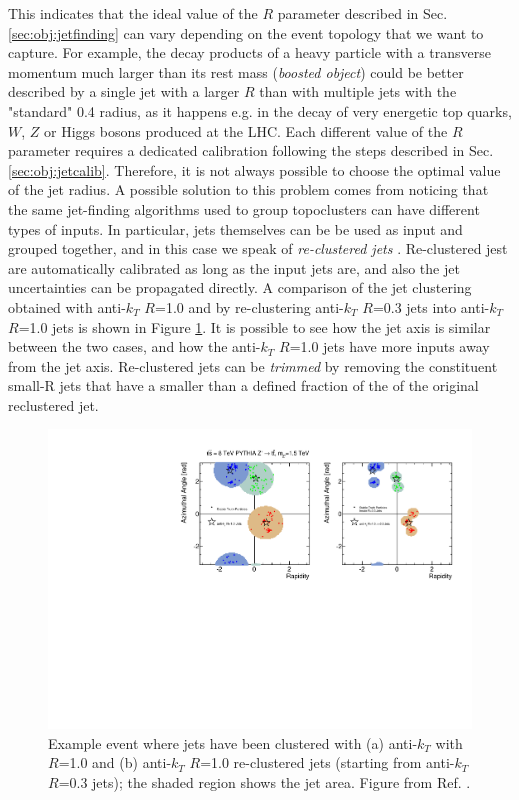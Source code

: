 This indicates that the ideal value of the $R$ parameter described in Sec. \ref{sec:obj:jetfinding} can vary depending on the event topology that we want to capture. 
For example, the decay products of a heavy particle with a transverse momentum much larger than its rest mass (\textit{boosted object}) could be better described by a 
single jet with a larger $R$ than with multiple jets with the "standard" 0.4 radius, 
as it happens e.g. in the decay of very energetic top quarks, $W$, $Z$ or Higgs bosons produced at the LHC.
Each different value of the $R$ parameter requires a dedicated calibration following the steps described in Sec. \ref{sec:obj:jetcalib}. 
Therefore, it is not always possible to choose the optimal value of the jet radius. 
A possible solution to this problem comes from noticing that the same jet-finding algorithms used to group topoclusters can have different types of inputs. 
In particular, jets themselves can be be used as input and grouped together, and in this case we speak of \textit{re-clustered jets} \cite{Nachman:2014kla}. 
Re-clustered jest are automatically calibrated as long as the input jets are, and also the jet uncertainties can be propagated directly. 
A comparison of the jet clustering obtained with anti-$k_T$ $R$=1.0 and by re-clustering anti-$k_T$ $R$=0.3 jets into anti-$k_T$ $R$=1.0 jets 
is shown in Figure \ref{fig:recluster}. It is possible to see how the jet axis is similar between the two cases, and how the anti-$k_T$ $R$=1.0 jets have more inputs away from the jet axis.
Re-clustered jets can be \textit{trimmed} by removing the constituent small-R jets that have a \pt smaller than a defined fraction of the \pt of the original reclustered jet. 


\begin{figure}[h]
\begin{center}
\includegraphics[width=1.0\textwidth]{./figures/objects/reclustered.pdf}
\end{center}
\caption{Example event where jets have been clustered with (a) anti-$k_T$ with $R$=1.0 and (b) anti-$k_T$ $R$=1.0 re-clustered jets (starting from anti-$k_T$ $R$=0.3 jets); the shaded region shows the jet area. Figure from Ref. \cite{Nachman:2014kla}.}
\label{fig:recluster}
\end{figure}

